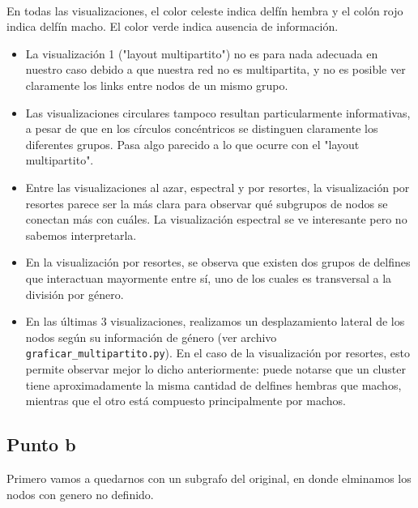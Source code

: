 \documentclass[11pt]{article}
\providecommand{\tightlist}{%
      \setlength{\itemsep}{0pt}\setlength{\parskip}{0pt}}
\begin{document}
    \begin{center}
    \end{center}
    { \hspace*{\fill} \\}
    
    En todas las visualizaciones, el color celeste indica delfín hembra y el
colón rojo indica delfín macho. El color verde indica ausencia de
información.

\begin{itemize}
\tightlist
\item
  La visualización 1 ("layout multipartito") no es para nada adecuada en
  nuestro caso debido a que nuestra red no es multipartita, y no es
  posible ver claramente los links entre nodos de un mismo grupo.
\item
  Las visualizaciones circulares tampoco resultan particularmente
  informativas, a pesar de que en los círculos concéntricos se
  distinguen claramente los diferentes grupos. Pasa algo parecido a lo
  que ocurre con el "layout multipartito".
\item
  Entre las visualizaciones al azar, espectral y por resortes, la
  visualización por resortes parece ser la más clara para observar qué
  subgrupos de nodos se conectan más con cuáles. La visualización
  espectral se ve interesante pero no sabemos interpretarla.
\item
  En la visualización por resortes, se observa que existen dos grupos de
  delfines que interactuan mayormente entre sí, uno de los cuales es
  transversal a la división por género.
\item
  En las últimas 3 visualizaciones, realizamos un desplazamiento lateral
  de los nodos según su información de género (ver archivo
  \texttt{graficar\_multipartito.py}). En el caso de la visualización
  por resortes, esto permite observar mejor lo dicho anteriormente:
  puede notarse que un cluster tiene aproximadamente la misma cantidad
  de delfines hembras que machos, mientras que el otro está compuesto
  principalmente por machos.
\end{itemize}

    \subsection{Punto b}\label{punto-b}

    Primero vamos a quedarnos con un subgrafo del original, en donde
elminamos los nodos con genero no definido.
\end{document}
